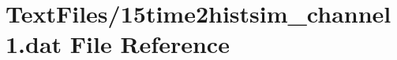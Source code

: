 \hypertarget{15time2histsim__channel1_8dat}{}\section{Text\+Files/15time2histsim\+\_\+channel1.dat File Reference}
\label{15time2histsim__channel1_8dat}
